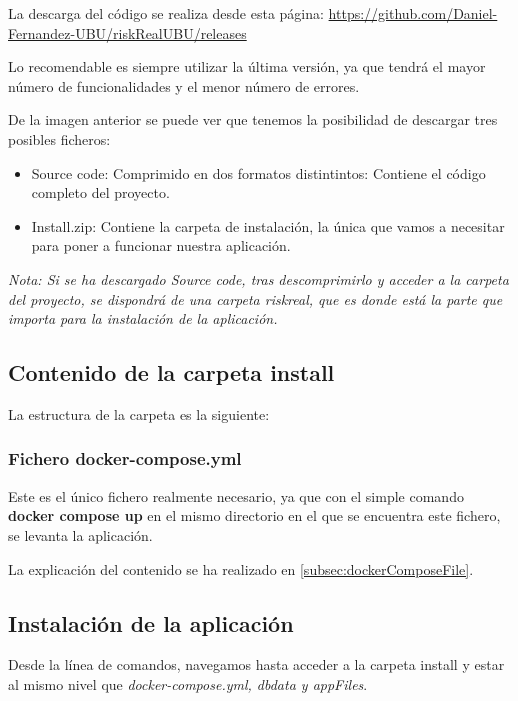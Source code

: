 La descarga del código se realiza desde esta página: \url{https://github.com/Daniel-Fernandez-UBU/riskRealUBU/releases}


Lo recomendable es siempre utilizar la última versión, ya que tendrá el mayor número de funcionalidades y el menor número de errores.

De la imagen anterior se puede ver que tenemos la posibilidad de descargar tres posibles ficheros:

\begin{itemize}
	\item Source code: Comprimido en dos formatos distintintos: Contiene el código completo del proyecto.
	\item Install.zip: Contiene la carpeta de instalación, la única que vamos a necesitar para poner a funcionar nuestra aplicación.
\end{itemize}

\textit{Nota: Si se ha descargado Source code, tras descomprimirlo y acceder a la carpeta del proyecto, se dispondrá de una carpeta \textit{riskreal}, que es donde está la parte que importa para la instalación de la aplicación.}

\subsection{Contenido de la carpeta install}

La estructura de la carpeta es la siguiente:


\subsubsection{Fichero docker-compose.yml}

Este es el único fichero realmente necesario, ya que con el simple comando \textbf{docker compose up} en el mismo directorio en el que se encuentra este fichero, se levanta la aplicación.

La explicación del contenido se ha realizado en \ref{subsec:dockerComposeFile}.

\subsection{Instalación de la aplicación}

Desde la línea de comandos, navegamos hasta acceder a la carpeta install y estar al mismo nivel que \textit{docker-compose.yml, dbdata y appFiles}.


